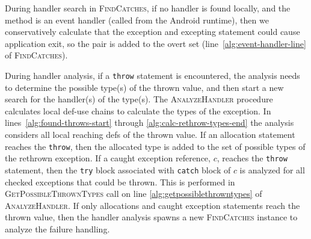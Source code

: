 During handler search in \textsc{FindCatches}, if no handler is found
locally, and the method is an event handler (called from the
Android runtime), then we conservatively calculate that the exception
and excepting statement could cause application exit, so the pair is
added to the overt set (line~\ref{alg:event-handler-line} of
\textsc{FindCatches}). 

During handler analysis, if a \lstinline!throw! statement is
encountered, the analysis needs to
determine the possible type(s) of the thrown value, and then start a new
search for the handler(s) of the type(s).  The \textsc{AnalyzeHandler} procedure
calculates local def-use chains to calculate the types of the
exception.  In lines~\ref{alg:found-throws-start} through
\ref{alg:calc-rethrow-types-end} the analysis considers all local
reaching defs of the thrown value.  If an allocation statement
reaches the \lstinline!throw!, then the allocated type is added to the
set of possible types of the rethrown exception. If a caught exception
reference, $c$, reaches
the \lstinline!throw! statement, then the \lstinline!try! block
associated with \lstinline!catch! block of $c$ is analyzed for all
checked exceptions that could be thrown.  This is performed in
\textsc{GetPossibleThrownTypes} call on line
\ref{alg:getpossiblethrowntypes} of \textsc{AnalyzeHandler}.  If only
allocations and caught exception statements reach the thrown value,
then the handler analysis spawns a new \textsc{FindCatches} instance
to analyze the failure handling.






